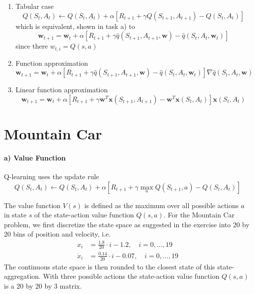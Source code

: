 \documentclass{article}
\newcommand{\wb}{\mathbf{w}}
\newcommand{\xb}{\mathbf{x}}
\begin{document}
\begin{enumerate}
\item Tabular case
    $$Q(S_t, A_t) \leftarrow Q(S_t, A_t) + \alpha[R_{t+1} + \gamma Q(S_{t+1}, A_{t+1})- Q(S_t, A_t)]$$
    which is equivalent, shown in task a) to
    $$\mathbf{w}_{t+1} = \mathbf{w}_t + \alpha[R_{t+1} + \gamma \hat{q}(S_{t+1},A_{t+1},\mathbf{w})- \hat{q}(S_t, A_t, \wb_t)]$$
    since there $w_{t,i} = Q(s, a)$
\item Function approximation
$$\mathbf{w}_{t+1} = \mathbf{w}_t + \alpha[R_{t+1} + \gamma \hat{q}(S_{t+1},A_{t+1},\mathbf{w})- \hat{q}(S_t, A_t, \wb_t)]\nabla \hat{q}(S_t, A_t, \wb)$$
\item Linear function approximation
$$\mathbf{w}_{t+1} = \mathbf{w}_t + \alpha[R_{t+1} + \gamma \wb^T \xb(S_{t+1},A_{t+1})- \wb^T \xb(S_t, A_t)] \xb(S_{t}, A_t)$$


\end{enumerate}



\section{Mountain Car}

\paragraph*{a) Value Function}

Q-learning uses the update rule
\begin{equation}
    Q(S_t, A_t) \leftarrow Q(S_t, A_t) + \alpha[R_{t+1} + \gamma \max_a Q(S_{t+1}, a) - Q(S_t, A_t)]
\end{equation}

The value function $V(s)$ is defined as the maximum over all possible actions $a$ in state $s$ of the state-action value function $Q(s, a)$. For the Mountain Car problem, we first discretize the state space as suggested in the exercise into 20 by 20 bins of position and velocity, i.e.
\begin{align}
    x_i &= \frac{1.8}{20} \cdot i - 1.2, \quad i = 0, \hdots, 19 \\
    \dot{x}_i &= \frac{0.14}{20} \cdot i - 0.07, \quad i = 0, \hdots, 19
\end{align}
The continuous state space is then rounded to the closest state of this state-aggregation. With three possible actions the state-action value function $Q(s, a)$ is a 20 by 20 by 3 matrix. 
\end{document}
